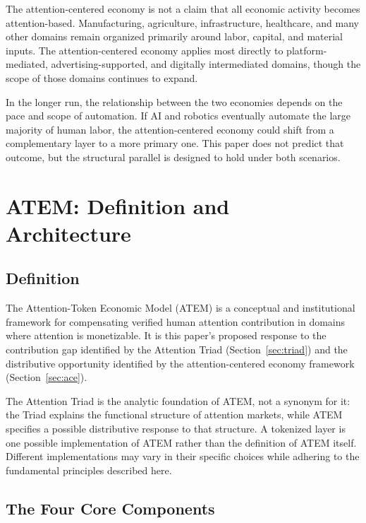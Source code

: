 \documentclass[12pt, a4paper]{article}
\begin{document}
The attention-centered economy is not a claim that all economic activity becomes attention-based. Manufacturing, agriculture, infrastructure, healthcare, and many other domains remain organized primarily around labor, capital, and material inputs. The attention-centered economy applies most directly to platform-mediated, advertising-supported, and digitally intermediated domains, though the scope of those domains continues to expand.

In the longer run, the relationship between the two economies depends on the pace and scope of automation. If AI and robotics eventually automate the large majority of human labor, the attention-centered economy could shift from a complementary layer to a more primary one. This paper does not predict that outcome, but the structural parallel is designed to hold under both scenarios.


\section{ATEM: Definition and Architecture}
\label{sec:atem}

\subsection{Definition}
\label{sec:atem-def}

The Attention-Token Economic Model (ATEM) is a conceptual and institutional framework for compensating verified human attention contribution in domains where attention is monetizable. It is this paper's proposed response to the contribution gap identified by the Attention Triad (Section~\ref{sec:triad}) and the distributive opportunity identified by the attention-centered economy framework (Section~\ref{sec:ace}).

The Attention Triad is the analytic foundation of ATEM, not a synonym for it: the Triad explains the functional structure of attention markets, while ATEM specifies a possible distributive response to that structure. A tokenized layer is one possible implementation of ATEM rather than the definition of ATEM itself. Different implementations may vary in their specific choices while adhering to the fundamental principles described here.

\subsection{The Four Core Components}
\label{sec:atem-components}
\end{document}
